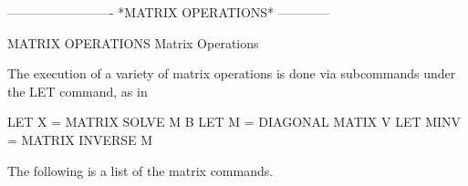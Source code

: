  
 
 
 
 
 
 
 
 
 
 
 
 
 
 
 
 
 
 
 
 
 
 
 
 
 
 
 
 
-------------------------  *MATRIX OPERATIONS*  ------------
 
MATRIX OPERATIONS
Matrix Operations
 
The execution of a variety of matrix operations is done via
subcommands under the LET command, as in
 
   LET X = MATRIX SOLVE M B
   LET M = DIAGONAL MATIX V
   LET MINV = MATRIX INVERSE M
 
The following is a list of the matrix commands.
 
